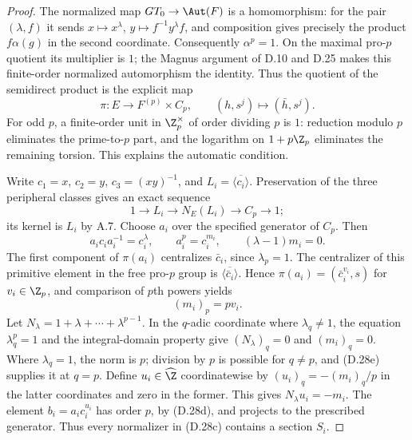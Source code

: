 \begin{proof}
The normalized map $GT_0\to\Aut(F)$ is a homomorphism:
for the pair $(\lambda,f)$ it sends
$x\mapsto x^\lambda$, $y\mapsto f^{-1}y^\lambda f$, and
composition gives precisely the product $f\alpha(g)$ in
the second coordinate. Consequently $\alpha^p=1$.
On the maximal pro-$p$ quotient its multiplier is $1$;
the Magnus argument of D.10 and D.25 makes this finite-order
normalized automorphism the identity. Thus the quotient of
the semidirect product is the explicit map
\[
 \pi:E\longrightarrow F^{(p)}\times C_p,
                  \qquad(h,s^j)\longmapsto(\bar h,s^j).
                                                               \tag{D.28b}
\]
For odd $p$, a finite-order unit in $\Z_p^\times$ of order
dividing $p$ is $1$: reduction modulo $p$ eliminates the
prime-to-$p$ part, and the logarithm on $1+p\Z_p$ eliminates
the remaining torsion. This explains the automatic condition.

Write $c_1=x$, $c_2=y$, $c_3=(xy)^{-1}$, and
$L_i=\overline{\langle c_i\rangle}$. Preservation of the
three peripheral classes gives an exact sequence
\[
 1\longrightarrow L_i\longrightarrow N_E(L_i)
                \longrightarrow C_p\longrightarrow1;
                                                               \tag{D.28c}
\]
its kernel is $L_i$ by A.7. Choose $a_i$ over the specified
generator of $C_p$. Then
\[
 a_i c_i a_i^{-1}=c_i^\lambda,\qquad
 a_i^p=c_i^{m_i},\qquad (\lambda-1)m_i=0.
                                                               \tag{D.28d}
\]
The first component of $\pi(a_i)$ centralizes $\bar c_i$,
since $\lambda_p=1$. The centralizer of this primitive
element in the free pro-$p$ group is
$\overline{\langle\bar c_i\rangle}$. Hence
$\pi(a_i)=(\bar c_i^{v_i},s)$ for $v_i\in\Z_p$, and
comparison of $p$th powers yields
\[
                            (m_i)_p=pv_i.
                                                               \tag{D.28e}
\]
Let $N_\lambda=1+\lambda+\cdots+\lambda^{p-1}$.
In the $q$-adic coordinate where $\lambda_q\ne1$,
the equation $\lambda_q^p=1$ and the integral-domain
property give $(N_\lambda)_q=0$ and $(m_i)_q=0$.
Where $\lambda_q=1$, the norm is $p$; division by $p$
is possible for $q\ne p$, and (D.28e) supplies it at
$q=p$. Define $u_i\in\widehat\Z$ coordinatewise by
$(u_i)_q=-(m_i)_q/p$ in the latter coordinates and zero
in the former. This gives
$N_\lambda u_i=-m_i$. The element
$b_i=a_i c_i^{u_i}$ has order $p$, by (D.28d), and
projects to the prescribed generator. Thus every
normalizer in (D.28c) contains a section $S_i$.


\end{proof}
